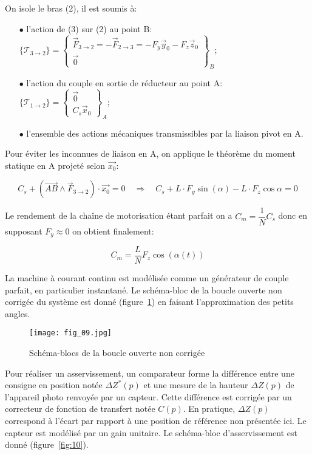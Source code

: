 \ifprof
\begin{corrige}
On isole le bras (2), il est soumis à:
\begin{itemize}
\item[$\bullet$] l'action de (3) sur (2) au point B: $\{ \mathcal{T}_{3\to2} \} = \begin{Bmatrix} \overrightarrow{F}_{3\to2} = -\overrightarrow{F}_{2\to3} = -F_y \vec{y}_0 - F_z \vec{z}_0 \\ \overrightarrow{0} \end{Bmatrix}_B$;
\item[$\bullet$] l'action du couple en sortie de réducteur au point A: $\{ \mathcal{T}_{1\to2} \} = \begin{Bmatrix} \overrightarrow{0}  \\ C_s \vec{x}_0 \end{Bmatrix}_A$;
\item[$\bullet$] l'ensemble des actions mécaniques transmissibles par la liaison pivot en A.
\end{itemize}

Pour éviter les inconnues de liaison en A, on applique le théorème du moment statique en A projeté selon $\overrightarrow{x_0}$:

$$ C_s + (\overrightarrow{AB} \wedge \overrightarrow{F}_{3 \to 2})\cdot \overrightarrow{x_0} = 0 \quad \Rightarrow \quad C_s + L\cdot F_y\sin(\alpha) - L\cdot F_z\cos{\alpha} = 0 $$

Le rendement de la chaîne de motorisation étant parfait on a $C_m = \dfrac{1}{N}C_s$ donc en supposant $F_y \approx 0$ on obtient finalement:

$$ \boxed{C_m = \dfrac{L}{N}F_z\cos(\alpha(t))} $$
\end{corrige}
\else
\fi

\ifprof
\else
La machine à courant continu est modélisée comme un générateur de couple parfait, en particulier instantané. Le schéma-bloc de la boucle ouverte non corrigée du système est donné (figure~\ref{fig:09}) en faisant l'approximation des petits angles.

\begin{figure}[H]
\centering
\texttt{[image: fig\_09.jpg]}
\caption{\label{fig:09} Schéma-blocs de la boucle ouverte non corrigée}
\end{figure}


Pour réaliser un asservissement, un comparateur forme la différence entre une consigne en position notée $\Delta Z^{*}(p)$ et une mesure de la hauteur $\Delta Z(p)$ de l'appareil photo renvoyée par un capteur. Cette différence est corrigée par un correcteur de fonction de transfert notée $C(p)$. En pratique, $\Delta Z(p)$ correspond à l'écart par rapport à une position de référence non présentée ici. Le capteur est modélisé par un gain unitaire. Le schéma-bloc d'asservissement est donné (figure~\ref{fig:10}).

